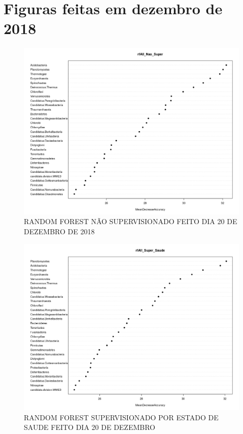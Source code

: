 \documentclass[12pt, a4paper]{report}
\begin{document}
\section{Figuras feitas em dezembro de 2018}

\begin{figure}[H]
	\centering
	\includegraphics[scale=0.3]{figures/RF_nao_super_2018_12_20.png}
	\caption{RANDOM FOREST NÃO SUPERVISIONADO FEITO DIA 20 DE DEZEMBRO DE 2018}
	\label{fig:RANDOM FOREST NAO SUPERVISIONADO FEITO DIA 20 DE DEZEMBRO}
\end{figure}

\begin{figure}[H]
	\centering
	\includegraphics[scale=0.3]{figures/RF_super_saude_2018_12_20.png}
	\caption{RANDOM FOREST SUPERVISIONADO POR ESTADO DE SAUDE FEITO DIA 20 DE DEZEMBRO}
	\label{fig: RANDOM FOREST SUPERVISIONADO POR ESTADO DE SAÚDE FEITO DIA 20 DE DEZEMBRO}
\end{figure}	
\end{document}
